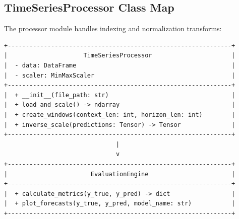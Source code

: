 \documentclass[11pt,journal,onecolumn]{IEEEtran}
\begin{document}
\subsection{TimeSeriesProcessor Class Map}
The processor module handles indexing and normalization transforms:
\begin{verbatim}
+--------------------------------------------------------------+
|                     TimeSeriesProcessor                      |
|  - data: DataFrame                                           |
|  - scaler: MinMaxScaler                                      |
+--------------------------------------------------------------+
|  + __init__(file_path: str)                                  |
|  + load_and_scale() -> ndarray                               |
|  + create_windows(context_len: int, horizon_len: int)        |
|  + inverse_scale(predictions: Tensor) -> Tensor              |
+--------------------------------------------------------------+
                               |
                               v
+--------------------------------------------------------------+
|                       EvaluationEngine                       |
+--------------------------------------------------------------+
|  + calculate_metrics(y_true, y_pred) -> dict                 |
|  + plot_forecasts(y_true, y_pred, model_name: str)           |
+--------------------------------------------------------------+
\end{verbatim}
\end{document}
